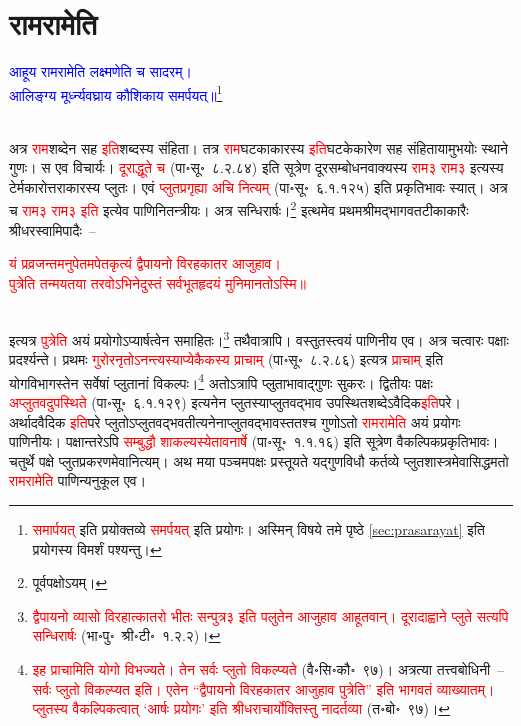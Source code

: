 \section[रामरामेति]{रामरामेति}
\centering\textcolor{blue}{आहूय रामरामेति लक्ष्मणेति च सादरम्।\nopagebreak\\
आलिङ्ग्य मूर्ध्न्यवघ्राय कौशिकाय समर्पयत्॥\footnote{\textcolor{red}{समार्पयत्} इति प्रयोक्तव्ये \textcolor{red}{समर्पयत्} इति प्रयोगः। अस्मिन् विषये \pageref{sec:prasarayat}तमे पृष्ठे \ref{sec:prasarayat}  इति प्रयोगस्य विमर्शं पश्यन्तु।}}\nopagebreak\\
\\
\begin{sloppypar}\justifying\noindent\hspace{10mm} अत्र \textcolor{red}{राम}\-शब्देन सह \textcolor{red}{इति}\-शब्दस्य संहिता। तत्र \textcolor{red}{राम}\-घटकाकारस्य \textcolor{red}{इति}\-घटकेकारेण सह संहितायामुभयोः स्थाने गुणः। स एव विचार्यः। \textcolor{red}{दूराद्धूते च} (पा॰सू॰~८.२.८४) इति सूत्रेण दूर\-सम्बोधन\-वाक्यस्य \textcolor{red}{राम३ राम३} इत्यस्य टेर्मकारोत्तराकारस्य प्लुतः। एवं \textcolor{red}{प्लुत\-प्रगृह्या अचि नित्यम्‌} (पा॰सू॰~६.१.१२५) इति प्रकृति\-भावः स्यात्। अत्र च \textcolor{red}{राम३ राम३ इति} इत्येव पाणिनि\-तन्त्रीयः। अत्र सन्धिरार्षः।\footnote{पूर्वपक्षोऽयम्।} इत्थमेव प्रथम\-श्रीमद्भागवत\-टीका\-कारैः श्रीधर\-स्वामि\-पादैः~–\end{sloppypar}
\centering\textcolor{red}{यं प्रव्रजन्तमनुपेतमपेतकृत्यं द्वैपायनो विरहकातर आजुहाव।\nopagebreak\\
पुत्रेति तन्मयतया तरवोऽभिनेदुस्तं सर्वभूतहृदयं मुनिमानतोऽस्मि॥}\nopagebreak\\
\\
\begin{sloppypar}\justifying\noindent इत्यत्र \textcolor{red}{पुत्रेति} अयं प्रयोगोऽप्यार्षत्वेन समाहितः।\footnote{\textcolor{red}{द्वैपायनो व्यासो विरहात्कातरो भीतः सन्पुत्र३ इति पलुतेन आजुहाव आहूतवान्। दूरादाह्वाने प्लुते सत्यपि सन्धिरार्षः} (भा॰पु॰~श्री॰टी॰~१.२.२)।} तथैवात्रापि। वस्तुतस्त्वयं पाणिनीय एव। अत्र चत्वारः पक्षाः प्रदर्श्यन्ते। प्रथमः \textcolor{red}{गुरोरनृतोऽनन्त्यस्याप्येकैकस्य प्राचाम्‌} (पा॰सू॰~८.२.८६) इत्यत्र \textcolor{red}{प्राचाम्‌} इति योग\-विभागस्तेन सर्वेषां प्लुतानां विकल्पः।\footnote{\textcolor{red}{इह प्राचामिति योगो विभज्यते। तेन सर्वः प्लुतो विकल्प्यते} (वै॰सि॰कौ॰~९७)। अत्रत्या तत्त्वबोधिनी~– \textcolor{red}{सर्वः प्लुतो विकल्प्यत इति। एतेन “द्वैपायनो विरहकातर आजुहाव पुत्रेति” इति भागवतं व्याख्यातम्। प्लुतस्य वैकल्पिकत्वात् ‘आर्षः प्रयोगः’ इति श्रीधराचार्योक्तिस्तु नादर्तव्या} (त॰बो॰~९७)।} अतोऽत्रापि प्लुताभावाद्गुणः सुकरः। द्वितीयः पक्षः \textcolor{red}{अप्लुतवदुपस्थिते} (पा॰सू॰~६.१.१२९) इत्यनेन प्लुतस्याप्लुतवद्भाव उपस्थित\-शब्देऽवैदिक\-\textcolor{red}{इति}\-परे। अर्थादवैदिक \textcolor{red}{इति}\-परे प्लुतोऽप्लुत\-वद्भवतीत्यनेनाप्लुत\-वद्भावस्ततश्च गुणोऽतो \textcolor{red}{रामरामेति} अयं प्रयोगः पाणिनीयः। पक्षान्तरेऽपि \textcolor{red}{सम्बुद्धौ शाकल्यस्येतावनार्षे} (पा॰सू॰~१.१.१६) इति सूत्रेण वैकल्पिक\-प्रकृति\-भावः। चतुर्थे पक्षे प्लुत\-प्रकरणमेवानित्यम्। अथ मया पञ्चम\-पक्षः प्रस्तूयते यद्गुण\-विधौ कर्तव्ये प्लुत\-शास्त्रमेवासिद्धमतो \textcolor{red}{रामरामेति} पाणिन्यनुकूल एव।\end{sloppypar}
